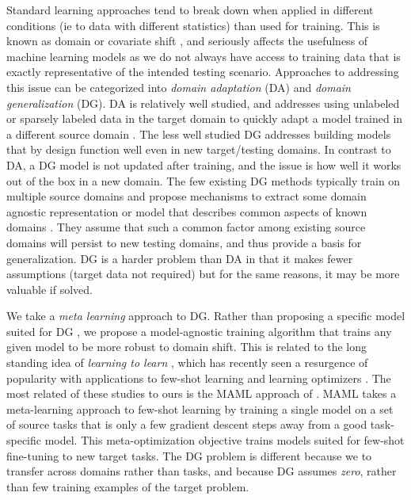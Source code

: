 \documentclass[letterpaper]{article} \usepackage{aaai18}  \usepackage{times}  \usepackage{helvet}  \usepackage{courier}  \usepackage{url}  \usepackage{graphicx}  \usepackage{amsmath}
\begin{document}
Standard learning approaches tend to break down when applied in different conditions (ie to data with different statistics) than used for training. This is known as domain or covariate shift \cite{storkey2007covariateShift}, and seriously affects the usefulness of machine learning models as we do not always have access to training data that is exactly representative of the intended testing scenario. Approaches to addressing this issue can be categorized into \textit{domain adaptation} (DA) and \textit{domain generalization} (DG). DA is relatively well studied, and addresses using unlabeled or sparsely labeled data in the target domain to quickly adapt a model trained in a different source domain \textcolor{black}{\cite{patel2015vdaSurvey,csurka2017domainAdaptationBook}}. The less well studied DG addresses building models that by design function well even in new target/testing domains. In contrast to DA, a DG model is not updated after training, and the issue  is how well it works out of the box in a new domain. The few existing DG methods typically train on multiple source domains and propose mechanisms to extract some domain agnostic representation or model that describes common aspects of known domains \cite{khosla2012undoing,muandet2013domain,ghifary2015domain,da2017dg}. They assume that such a common factor among existing source domains will persist to new testing domains, and thus provide a basis for generalization. DG is a harder problem  than DA in that it makes fewer assumptions (target data not required) but for the same reasons, it may be more valuable if solved.



We take a  \textit{meta learning} approach to DG. Rather than proposing a specific model suited for DG \cite{khosla2012undoing,ghifary2015domain,da2017dg}, we propose a model-agnostic training algorithm that trains any given model to be more robust to domain shift. This is related to the long standing idea of \emph{learning to learn} \cite{thrun1998learntolearn,schmidhuber1997inductiveBias}, which has recently seen a resurgence of popularity with applications to few-shot learning \cite{finn2017model,ravi2016optimization} and learning optimizers \cite{andrychowicz2016learning}. The most related of these studies to ours is the MAML approach of \cite{finn2017model}. MAML takes a meta-learning approach to few-shot learning by training a single model on a set of source tasks that is only a few gradient descent steps away from a good task-specific model. This meta-optimization objective trains models suited for few-shot fine-tuning to new target tasks. The DG problem is different because we to transfer across domains rather than tasks, and because DG assumes \emph{zero}, rather than few training examples of the target problem. 
\end{document}
